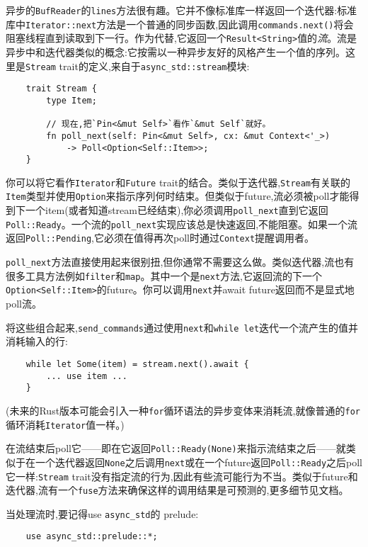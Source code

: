 异步的\texttt{BufReader}的\texttt{lines}方法很有趣。它并不像标准库一样返回一个迭代器:标准库中\texttt{Iterator::next}方法是一个普通的同步函数,因此调用\texttt{commands.next()}将会阻塞线程直到读取到下一行。作为代替,它返回一个\texttt{Result<String>}值的\emph{流}。流是异步中和迭代器类似的概念:它按需以一种异步友好的风格产生一个值的序列。这里是\texttt{Stream} trait的定义,来自于\texttt{async\_std::stream}模块:
\begin{verbatim}
    trait Stream {
        type Item;

        // 现在,把`Pin<&mut Self>`看作`&mut Self`就好。
        fn poll_next(self: Pin<&mut Self>, cx: &mut Context<'_>)
            -> Poll<Option<Self::Item>>;
    }
\end{verbatim}

你可以将它看作\texttt{Iterator}和\texttt{Future} trait的结合。类似于迭代器,\texttt{Stream}有关联的\texttt{Item}类型并使用\texttt{Option}来指示序列何时结束。但类似于future,流必须被poll才能得到下一个item(或者知道stream已经结束),你必须调用\texttt{poll\_next}直到它返回\texttt{Poll::Ready}。一个流的\texttt{poll\_next}实现应该总是快速返回,不能阻塞。如果一个流返回\texttt{Poll::Pending},它必须在值得再次poll时通过\texttt{Context}提醒调用者。

\texttt{poll\_next}方法直接使用起来很别扭,但你通常不需要这么做。类似迭代器,流也有很多工具方法例如\texttt{filter}和\texttt{map}。其中一个是\texttt{next}方法,它返回流的下一个\texttt{Option<Self::Item>}的future。你可以调用\texttt{next}并await future返回而不是显式地poll流。

将这些组合起来,\texttt{send\_commands}通过使用\texttt{next}和\texttt{while let}迭代一个流产生的值并消耗输入的行:
\begin{verbatim}
    while let Some(item) = stream.next().await {
        ... use item ...
    }
\end{verbatim}

(未来的Rust版本可能会引入一种\texttt{for}循环语法的异步变体来消耗流,就像普通的\texttt{for}循环消耗\texttt{Iterator}值一样。)

在流结束后poll它——即在它返回\texttt{Poll::Ready(None)}来指示流结束之后——就类似于在一个迭代器返回\texttt{None}之后调用\texttt{next}或在一个future返回\texttt{Poll::Ready}之后poll它一样:\texttt{Stream} trait没有指定流的行为,因此有些流可能行为不当。类似于future和迭代器,流有一个\texttt{fuse}方法来确保这样的调用结果是可预测的,更多细节见文档。

当处理流时,要记得use \texttt{async\_std}的 prelude:
\begin{verbatim}
    use async_std::prelude::*;
\end{verbatim}


